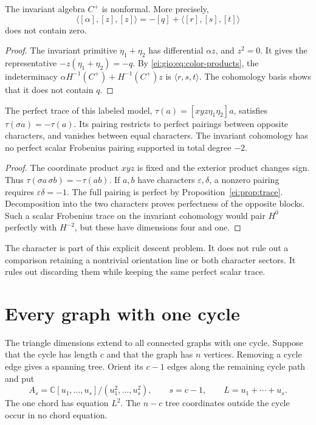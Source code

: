 \begin{corollary}\label{ei:gio:cor:color-massey}
The invariant algebra $C^+$ is nonformal. More precisely,
\begin{equation}\label{ei:gio:eq:color-massey}
 \langle[\alpha],[z],[z]\rangle
 =-[q]+\langle[r],[s],[t]\rangle
\end{equation}
does not contain zero.
\end{corollary}

\begin{proof}
The invariant primitive $\eta_1+\eta_2$ has differential
$\alpha z$, and $z^2=0$. It gives the representative
$-z(\eta_1+\eta_2)=-q$. By
\eqref{ei:gio:eq:color-products}, the indeterminacy
$\alpha H^{-1}(C^+)+H^{-1}(C^+)z$ is
$\langle r,s,t\rangle$. The cohomology basis shows
that it does not contain $q$.
\end{proof}

\begin{proposition}\label{ei:gio:prop:trace-character}
The perfect trace of this labeled model,
$\tau(a)=[xyz\eta_1\eta_2]a$, satisfies
$\tau(\sigma a)=-\tau(a)$. Its pairing restricts to
perfect pairings between opposite characters, and
vanishes between equal characters. The invariant
cohomology has no perfect scalar Frobenius pairing
supported in total degree $-2$.
\end{proposition}

\begin{proof}
The coordinate product $xyz$ is fixed and the exterior
product changes sign. Thus
$\tau(\sigma a\,\sigma b)=-\tau(ab)$.
If $a,b$ have characters $\varepsilon,\delta$, a
nonzero pairing requires $\varepsilon\delta=-1$.
The full pairing is perfect by
Proposition~\ref{ei:prop:trace}. Decomposition into
the two characters proves perfectness of the opposite
blocks. Such a scalar Frobenius trace on the
invariant cohomology would pair $H^0$ perfectly with
$H^{-2}$, but these have dimensions four and one.
\end{proof}

The character is part of this explicit descent problem.
It does not rule out a comparison retaining a nontrivial
orientation line or both character sectors. It rules
out discarding them while keeping the same perfect
scalar trace.

\section{Every graph with one cycle}

The triangle dimensions extend to all connected graphs
with one cycle. Suppose that the cycle has length $c$
and that the graph has $n$ vertices. Removing a cycle
edge gives a spanning tree. Orient its $c-1$ edges
along the remaining cycle path and put
\[
 A_s=\mathbb C[u_1,\ldots,u_s]/(u_1^2,\ldots,u_s^2),
 \qquad s=c-1,\qquad L=u_1+\cdots+u_s.
\]
The one chord has equation $L^2$. The $n-c$ tree
coordinates outside the cycle occur in no chord equation.

